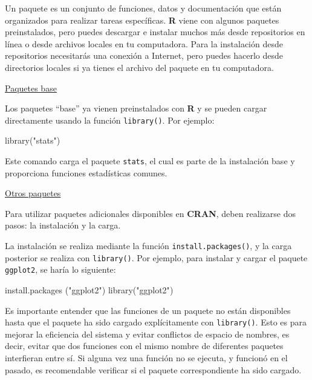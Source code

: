 \documentclass[
  letterpaper,
  DIV=11,
  numbers=noendperiod]{scrreprt}
\newenvironment{Shaded}{\begin{snugshade}}{\end{snugshade}}
\newcommand{\FunctionTok}[1]{\textcolor[rgb]{0.28,0.35,0.67}{#1}}
\newcommand{\NormalTok}[1]{\textcolor[rgb]{0.00,0.23,0.31}{#1}}
\newcommand{\StringTok}[1]{\textcolor[rgb]{0.13,0.47,0.30}{#1}}
\begin{document}
Un paquete es un conjunto de funciones, datos y documentación que están
organizados para realizar tareas específicas. \textbf{R} viene con
algunos paquetes preinstalados, pero puedes descargar e instalar muchos
más desde repositorios en línea o desde archivos locales en tu
computadora. Para la instalación desde repositorios necesitarás una
conexión a Internet, pero puedes hacerlo desde directorios locales si ya
tienes el archivo del paquete en tu computadora.

\uline{Paquetes base}

Los paquetes ``base'' ya vienen preinstalados con \textbf{R} y se pueden
cargar directamente usando la función \texttt{library()}. Por ejemplo:

\begin{Shaded}
\begin{Highlighting}[]
\FunctionTok{library}\NormalTok{(}\StringTok{"stats"}\NormalTok{)}
\end{Highlighting}
\end{Shaded}

Este comando carga el paquete \texttt{stats}, el cual es parte de la
instalación base y proporciona funciones estadísticas comunes.

\uline{Otros paquetes}

Para utilizar paquetes adicionales disponibles en \textbf{CRAN}, deben
realizarse dos pasos: la instalación y la carga.

La instalación se realiza mediante la función
\texttt{install.packages()}, y la carga posterior se realiza con
\texttt{library()}. Por ejemplo, para instalar y cargar el paquete
\texttt{ggplot2}, se haría lo siguiente:

\begin{Shaded}
\begin{Highlighting}[]
\FunctionTok{install.packages}\NormalTok{ (}\StringTok{"ggplot2"}\NormalTok{)   }
\FunctionTok{library}\NormalTok{(}\StringTok{"ggplot2"}\NormalTok{)           }
\end{Highlighting}
\end{Shaded}

Es importante entender que las funciones de un paquete no están
disponibles hasta que el paquete ha sido cargado explícitamente con
\texttt{library()}. Esto es para mejorar la eficiencia del sistema y
evitar conflictos de espacio de nombres, es decir, evitar que dos
funciones con el mismo nombre de diferentes paquetes interfieran entre
sí. Si alguna vez una función no se ejecuta, y funcionó en el pasado, es
recomendable verificar si el paquete correspondiente ha sido cargado.
\end{document}
